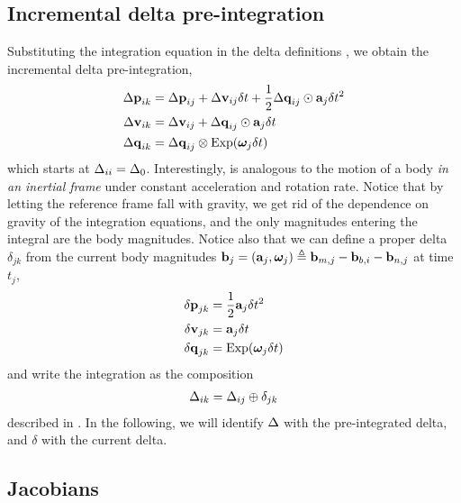 \subsection{Incremental delta pre-integration}

Substituting the integration equation  in the delta definitions , we obtain the incremental delta pre-integration,
%
\begin{align}\label{equ:g_second_order_pre-integration}
\begin{split}
{\Delta{\bf p}}_{ik} 
&= {\Delta{\bf p}}_{ij} + {\Delta{\bf v}}_{ij}\delta t + \frac12{\Delta{\bf q}}_{ij}\odot{\bf a}_j\delta t^2 \\
{\Delta{\bf v}}_{ik} 
&= {\Delta{\bf v}}_{ij} + {\Delta{\bf q}}_{ij}\odot{\bf a}_j\delta t \\
{\Delta{\bf q}}_{ik} 
&= {\Delta{\bf q}}_{ij}\otimes\operatorname*{Exp}({{\bm \omega}}_j\delta t) 
\end{split}
\end{align}
%
which starts at $\Delta_{ii}=\Delta_0$. Interestingly,  is analogous to the motion of a body \emph{in an inertial frame} under constant acceleration and rotation rate.
Notice that by letting the reference frame fall with gravity, we get rid of the dependence on gravity of the integration equations, and the only magnitudes entering the integral are the body magnitudes.
Notice also that we can define a proper delta $\delta_{jk}$ from the current body magnitudes ${\bf b}_j=({\bf a}_j,{{\bm \omega}}_j) \triangleq {\bf b}_{m,j} - {\bf b}_{b,i} - {\bf b}_{n,j}$ at time $t_j$,
%
\begin{align}\label{equ:delta_creation}
\begin{split}
{\delta{\bf p}}_{jk} &= \frac12{\bf a}_j\delta t^2 \\
{\delta{\bf v}}_{jk} &= {\bf a}_j\delta t \\
{\delta{\bf q}}_{jk} &= \operatorname*{Exp}({{\bm \omega}}_j\delta t)
\end{split}
\end{align}
%
and write the integration  as the composition 
%
\begin{align}\label{equ:composition_compact}
\Delta_{ik}=\Delta_{ij}\oplus\delta_{jk}
\end{align}
%
described in . In the following, we will identify $\Delta$ with the pre-integrated delta, and $\delta$ with the current delta.


\subsection{Jacobians}

